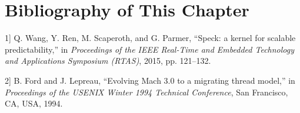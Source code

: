 \section{Bibliography of This Chapter}\label{sec:5-references}

\protect{}\label{cite:5-1}

\noindent {[}1{]} Q. Wang, Y. Ren, M. Scaperoth, and G. Parmer, ``Speck: a kernel for scalable predictability,'' in \textit{Proceedings of the IEEE Real-Time and Embedded Technology and Applications Symposium (RTAS)}, 2015, pp. 121--132.

\protect{}\label{cite:5-2}

\noindent {[}2{]} B. Ford and J. Lepreau, ``Evolving Mach 3.0 to a migrating thread model,'' in \textit{Proceedings of the USENIX Winter 1994 Technical Conference}, San Francisco, CA, USA, 1994.

